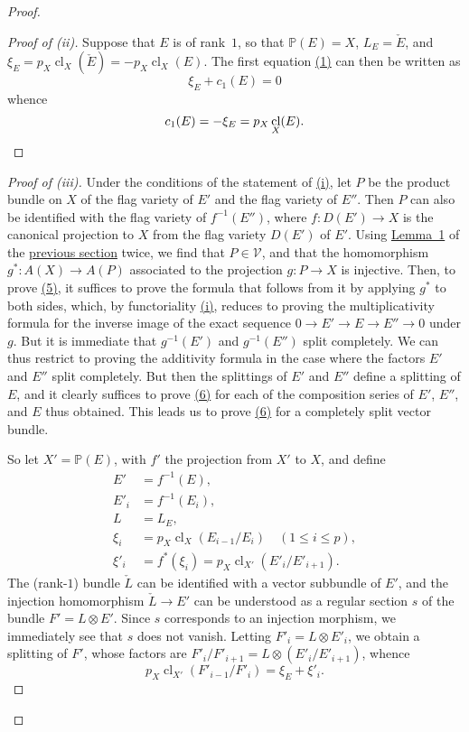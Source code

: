 \documentclass{article}
\renewcommand{\cal}[1]{{\mathcal{#1}}}
\renewcommand{\leq}{\leqslant}
\DeclareMathOperator{\cl}{cl}
\begin{document}
\begin{proof}
  \begin{proof}[Proof of \rm{(ii)}]
    Suppose that $E$ is of rank~$1$, so that $\mathbb{P}(E)=X$, $L_E=\check{E}$, and $\xi_E = p_X\cl_X(\check{E}) = -p_X\cl_X(E)$.
    The first equation \hyperref[equation1]{(1)} can then be written as
    \[
      \xi_E + c_1(E) = 0
    \]
    whence
    \[
      c_1(E) = -\xi_E = p_X\cl_X(E).\qedhere
    \]
  \end{proof}

  \begin{proof}[Proof of \rm{(iii)}]
    Under the conditions of the statement of \hyperref[theorem1i]{(i)}, let $P$ be the product bundle on $X$ of the flag variety of $E'$ and the flag variety of $E''$.
    Then $P$ can also be identified with the flag variety of $f^{-1}(E'')$, where $f\colon D(E')\to X$ is the canonical projection to $X$ from the flag variety $D(E')$ of $E'$.
    Using \hyperref[lemma1]{Lemma~1} of the \hyperref[section2]{previous section} twice, we find that $P\in\cal{V}$, and that the homomorphism $g^*\colon A(X)\to A(P)$ associated to the projection $g\colon P\to X$ is injective.
    Then, to prove \hyperref[equation5]{(5)}, it suffices to prove the formula that follows from it by applying $g^*$ to both sides, which, by functoriality \hyperref[theorem1i]{(i)}, reduces to proving the multiplicativity formula for the inverse image of the exact sequence $0\to E'\to E\to E''\to 0$ under $g$.
    But it is immediate that $g^{-1}(E')$ and $g^{-1}(E'')$ split completely.
    We can thus restrict to proving the additivity formula in the case where the factors $E'$ and $E''$ split completely.
    But then the splittings of $E'$ and $E''$ define a splitting of $E$, and it clearly suffices to prove \hyperref[equation6]{(6)} for each of the composition series of $E'$, $E''$, and $E$ thus obtained.
    This leads us to prove \hyperref[equation6]{(6)} for a completely split vector bundle.

    So let $X'=\mathbb{P}(E)$, with $f'$ the projection from $X'$ to $X$, and define
    \[
      \begin{aligned}
        E' &= f^{-1}(E),
      \\E'_i &= f^{-1}(E_i),
      \\L &= L_E,
      \\\xi_i &= p_X\cl_X(E_{i-1}/E_i)\quad(1\leq i\leq p),
      \\\xi'_i &= f^*(\xi_i) = p_X\cl_{X'}(E'_i/E'_{i+1}).
      \end{aligned}
    \]
    The (rank-$1$) bundle $\check{L}$ can be identified with a vector subbundle of $E'$, and the injection homomorphism $\check{L}\to E'$ can be understood as a regular section $s$ of the bundle $F'=L\otimes E'$.
    Since $s$ corresponds to an injection morphism, we immediately see that $s$ does not vanish.
    Letting $F'_i=L\otimes E'_i$, we obtain a splitting of $F'$, whose factors are $F'_i/F'_{i+1} = L\otimes(E'_i/E'_{i+1})$, whence
    \[
      p_X\cl_{X'}(F'_{i-1}/F'_{i}) = \xi_E+\xi'_i.
    \]


\end{proof}
\end{proof}
\end{document}
